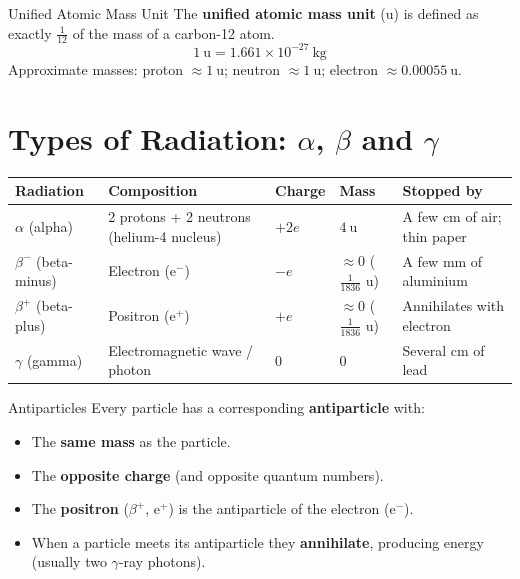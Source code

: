 \begin{definitionbox}{Unified Atomic Mass Unit}
The \textbf{unified atomic mass unit} (u) is defined as exactly $\tfrac{1}{12}$ of the mass of a carbon-12 atom.
$$1\ \text{u} = 1.661 \times 10^{-27}\ \text{kg}$$
Approximate masses: proton $\approx 1\ \text{u}$; neutron $\approx 1\ \text{u}$; electron $\approx 0.00055\ \text{u}$.
\end{definitionbox}

\section{Types of Radiation: $\alpha$, $\beta$ and $\gamma$}
\begin{center}
\renewcommand{\arraystretch}{1.5}
\begin{tabular}{@{} l p{2.8cm} p{2.0cm} p{2.2cm} p{3.4cm} @{}}
\toprule
\textbf{Radiation} & \textbf{Composition} & \textbf{Charge} & \textbf{Mass} & \textbf{Stopped by} \\
\midrule
$\alpha$ (alpha) & 2 protons + 2 neutrons (helium-4 nucleus) & $+2e$ & $4\ \text{u}$ & A few cm of air; thin paper \\
$\beta^-$ (beta-minus) & Electron ($\mathrm{e}^-$) & $-e$ & $\approx 0$ ($\tfrac{1}{1836}$ u) & A few mm of aluminium \\
$\beta^+$ (beta-plus) & Positron ($\mathrm{e}^+$) & $+e$ & $\approx 0$ ($\tfrac{1}{1836}$ u) & Annihilates with electron \\
$\gamma$ (gamma) & Electromagnetic wave / photon & $0$ & $0$ & Several cm of lead \\
\bottomrule
\end{tabular}
\end{center}

\begin{keybox}{Antiparticles}
Every particle has a corresponding \textbf{antiparticle} with:
\begin{itemize}[itemsep=2pt]
  \item The \textbf{same mass} as the particle.
  \item The \textbf{opposite charge} (and opposite quantum numbers).
  \item The \textbf{positron} ($\beta^+$, $\mathrm{e}^+$) is the antiparticle of the electron ($\mathrm{e}^-$).
  \item When a particle meets its antiparticle they \textbf{annihilate}, producing energy (usually two $\gamma$-ray photons).
\end{itemize}
\end{keybox}


